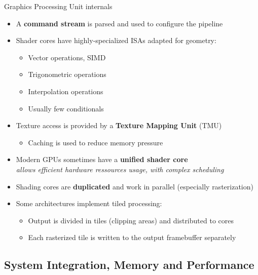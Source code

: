 \begin{frame}{Graphics Processing Unit internals}
  \begin{itemize}
  \item A \textbf{command stream} is parsed and used to configure the pipeline
  \item Shader cores have highly-specialized ISAs adapted for geometry:
  \begin{minipage}[b]{0.45\textwidth}
    \begin{itemize}
    \item Vector operations, SIMD
    \item Trigonometric operations
    \end{itemize}
  \end{minipage}
  \begin{minipage}[b]{0.45\textwidth}
    \begin{itemize}
    \item Interpolation operations
    \item Usually few conditionals
    \end{itemize}
  \end{minipage}
  \item Texture access is provided by a \textbf{Texture Mapping Unit} (TMU)
    \begin{itemize}
    \item Caching is used to reduce memory pressure
    \end{itemize}
  \item Modern GPUs sometimes have a \textbf{unified shader core}\\
    \textit{allows efficient hardware ressources usage, with complex scheduling}
  \item Shading cores are \textbf{duplicated} and work in parallel (especially rasterization)
  \item Some architectures implement tiled processing:
    \begin{itemize}
    \item Output is divided in tiles (clipping areas) and distributed to cores
    \item Each rasterized tile is written to the output framebuffer separately
    \end{itemize}
  \end{itemize}
\end{frame}

\subsection{System Integration, Memory and Performance}

